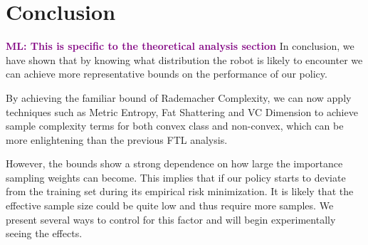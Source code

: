 \documentclass[10pt, conference]{ieeeconf}      %
\newcommand{\mlnote}[1]{\ifthenelse{ \boolean{include-notes}}%
 {\textcolor{purple}{\textbf{ML: #1}}}{}}
\begin{document}
  



\section{Conclusion}
\mlnote{This is specific to the theoretical analysis section}
In conclusion, we have shown that by knowing what distribution the robot is likely to encounter we can achieve more representative bounds on the performance of our policy. 

By achieving the familiar bound of Rademacher Complexity, we can now apply techniques such as Metric Entropy, Fat Shattering and VC Dimension to achieve sample complexity terms for both convex class and non-convex, which can be more enlightening than the previous FTL analysis. 

However, the bounds show a strong dependence on how large the importance sampling weights can become. This implies that if our policy starts to deviate from the training set during its empirical risk minimization. It is likely that the effective sample size could be quite low and thus require more samples. We present several ways to control for this factor and will begin experimentally seeing the effects.  



\end{document}
